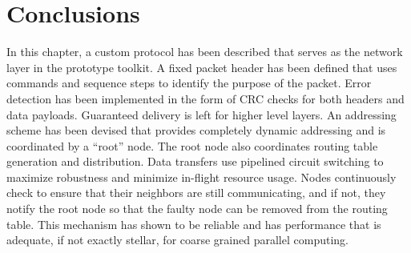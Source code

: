 \section{Conclusions}\label{sec:protocol:conclusions}

In this chapter, a custom protocol has been described that serves as the network layer in the prototype toolkit. A fixed packet header has been defined that uses commands and sequence steps to identify the purpose of the packet. Error detection has been implemented in the form of CRC checks for both headers and data payloads. Guaranteed delivery is left for higher level layers. An addressing scheme has been devised that provides completely dynamic addressing and is coordinated by a ``root'' node. The root node also coordinates routing table generation and distribution. Data transfers use pipelined circuit switching to maximize robustness and minimize in-flight resource usage. Nodes continuously check to ensure that their neighbors are still communicating, and if not, they notify the root node so that the faulty node can be removed from the routing table. This mechanism has shown to be reliable and has performance that is adequate, if not exactly stellar, for coarse grained parallel computing.